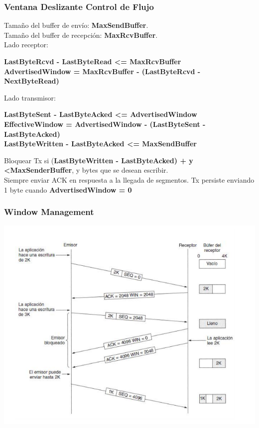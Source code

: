 \documentclass{beamer}
\begin{document}
 \begin{frame}
 		\frametitle{Ventana Deslizante Control de Flujo}
 		Tamaño del buffer de envío: \textbf{MaxSendBuffer}.\\
 		Tamaño del buffer de recepción: \textbf{MaxRcvBuffer}.\\
 		Lado receptor:
 		\begin{center}
 			\textbf{
 			LastByteRcvd - LastByteRead \textless= MaxRcvBuffer\\
 			 AdvertisedWindow = MaxRcvBuffer - (LastByteRcvd - NextByteRead)
 		}
 		\end{center}
 	Lado transmisor:
 	\begin{center}
 		\textbf{
 		LastByteSent - LastByteAcked  \textless= AdvertisedWindow\\
 		 EffectiveWindow = AdvertisedWindow - (LastByteSent - LastByteAcked)\\
 	 LastByteWritten - LastByteAcked \textless= MaxSendBuffer\\
 }\end{center}
 Bloquear Tx si (\textbf{LastByteWritten - LastByteAcked) + y \textless MaxSenderBuffer}, y
 bytes que se desean escribir.\\
 Siempre enviar ACK en respuesta a la llegada de segmentos. 
 Tx persiste enviando 1 byte cuando \textbf{AdvertisedWindow = 0} \\

 \end{frame}
\begin{frame}
	\frametitle{Window Management}
	\includegraphics[width=\textwidth]{WindowManagment}
\end{frame}
\end{document}
